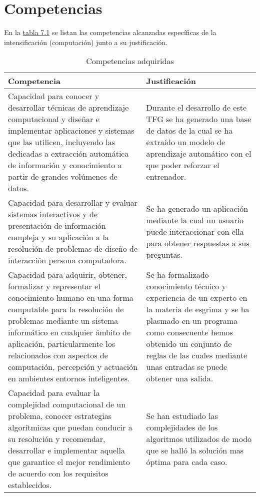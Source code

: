 \section{Competencias}
En la \hyperref[tab:competencias adquiridas]{tabla 7.1} se listan las competencias alcanzadas específicas de la intensificación
(computación) junto a su justificación.

\begin{longtable}{p{} p{}}
  \caption{Competencias adquiridas}
  \label{tab:competencias adquiridas}

  \endfirsthead
  \endhead

  \textbf{Competencia} & \textbf{Justificación} \\
  \hline
  \rowcolor[HTML]{D6D6D6}
  Capacidad para conocer y desarrollar técnicas de aprendizaje computacional y diseñar e implementar aplicaciones y sistemas que las utilicen, incluyendo las dedicadas a extracción automática de información y conocimiento a partir de grandes volúmenes de datos. & Durante el desarrollo de este TFG se ha generado una base de datos de la cual se ha extraído un modelo de aprendizaje automático con el que poder reforzar el entrenador.\\

  Capacidad para desarrollar y evaluar sistemas interactivos y de presentación de información compleja y su aplicación a la resolución de problemas de diseño de interacción persona computadora. & Se ha generado un aplicación mediante la cual un usuario puede interaccionar con ella para obtener respuestas a sus preguntas.\\

  \rowcolor[HTML]{D6D6D6}
  Capacidad para adquirir, obtener, formalizar y representar el conocimiento humano en una forma computable para la resolución de problemas mediante un sistema informático en cualquier ámbito de aplicación, particularmente los relacionados con aspectos de computación, percepción y actuación en ambientes entornos inteligentes. &  Se ha formalizado conocimiento técnico y experiencia de un experto en la materia de esgrima y se ha plasmado en un programa como consecuente hemos obtenido un conjunto de reglas de las cuales mediante unas entradas se puede obtener una salida.  \\

  Capacidad para evaluar la complejidad computacional de un problema, conocer estrategias algorítmicas que puedan conducir a su resolución y recomendar, desarrollar e implementar aquella que garantice el mejor rendimiento de acuerdo con los requisitos establecidos. & Se han estudiado las complejidades de los algoritmos utilizados de modo que se halló la solución mas óptima para cada caso. \\

  \hline
\end{longtable}




